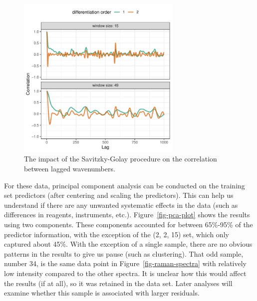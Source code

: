 \documentclass[
  letterpaper,
  DIV=11,
  numbers=noendperiod]{scrartcl}
\begin{document}
\begin{figure}[t!]

{\centering \includegraphics[width=0.7\textwidth,height=\textheight]{figures/fig-lagged-spectra-across-sets-1.pdf}

}

\caption{\label{fig-lagged-spectra-across-sets}The impact of the
Savitzky-Golay procedure on the correlation between lagged wavenumbers.}

\end{figure}

For these data, principal component analysis can be conducted on the
training set predictors (after centering and scaling the predictors).
This can help us understand if there are any unwanted systematic effects
in the data (such as differences in reagents, instruments, etc.).
Figure~\ref{fig-pca-plot} shows the results using two components. These
components accounted for between 65\%-95\% of the predictor information,
with the exception of the (2, 2, 15) set, which only captured about
45\%. With the exception of a single sample, there are no obvious
patterns in the results to give us pause (such as clustering). That odd
sample, number 34, is the same data point in
Figure~\ref{fig-raman-spectra} with relatively low intensity compared to
the other spectra. It is unclear how this would affect the results (if
at all), so it was retained in the data set. Later analyses will examine
whether this sample is associated with larger residuals.
\end{document}
